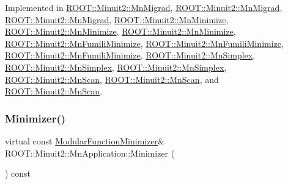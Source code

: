 Implemented in \mbox{\hyperlink{classROOT_1_1Minuit2_1_1MnMigrad_a98fa0ce74bf180a287093ac677e8644c}{R\+O\+O\+T\+::\+Minuit2\+::\+Mn\+Migrad}}, \mbox{\hyperlink{classROOT_1_1Minuit2_1_1MnMigrad_a98fa0ce74bf180a287093ac677e8644c}{R\+O\+O\+T\+::\+Minuit2\+::\+Mn\+Migrad}}, \mbox{\hyperlink{classROOT_1_1Minuit2_1_1MnMigrad_a98fa0ce74bf180a287093ac677e8644c}{R\+O\+O\+T\+::\+Minuit2\+::\+Mn\+Migrad}}, \mbox{\hyperlink{classROOT_1_1Minuit2_1_1MnMinimize_a879bb789f98c72f9a90a327fc7bb48fd}{R\+O\+O\+T\+::\+Minuit2\+::\+Mn\+Minimize}}, \mbox{\hyperlink{classROOT_1_1Minuit2_1_1MnMinimize_a879bb789f98c72f9a90a327fc7bb48fd}{R\+O\+O\+T\+::\+Minuit2\+::\+Mn\+Minimize}}, \mbox{\hyperlink{classROOT_1_1Minuit2_1_1MnMinimize_a879bb789f98c72f9a90a327fc7bb48fd}{R\+O\+O\+T\+::\+Minuit2\+::\+Mn\+Minimize}}, \mbox{\hyperlink{classROOT_1_1Minuit2_1_1MnFumiliMinimize_a96eb0cf96ae7ec874f912b6d2b3e7990}{R\+O\+O\+T\+::\+Minuit2\+::\+Mn\+Fumili\+Minimize}}, \mbox{\hyperlink{classROOT_1_1Minuit2_1_1MnFumiliMinimize_a96eb0cf96ae7ec874f912b6d2b3e7990}{R\+O\+O\+T\+::\+Minuit2\+::\+Mn\+Fumili\+Minimize}}, \mbox{\hyperlink{classROOT_1_1Minuit2_1_1MnFumiliMinimize_a96eb0cf96ae7ec874f912b6d2b3e7990}{R\+O\+O\+T\+::\+Minuit2\+::\+Mn\+Fumili\+Minimize}}, \mbox{\hyperlink{classROOT_1_1Minuit2_1_1MnSimplex_a8fa3495353e667d85e7dbeaffa94b94c}{R\+O\+O\+T\+::\+Minuit2\+::\+Mn\+Simplex}}, \mbox{\hyperlink{classROOT_1_1Minuit2_1_1MnSimplex_a8fa3495353e667d85e7dbeaffa94b94c}{R\+O\+O\+T\+::\+Minuit2\+::\+Mn\+Simplex}}, \mbox{\hyperlink{classROOT_1_1Minuit2_1_1MnSimplex_a8fa3495353e667d85e7dbeaffa94b94c}{R\+O\+O\+T\+::\+Minuit2\+::\+Mn\+Simplex}}, \mbox{\hyperlink{classROOT_1_1Minuit2_1_1MnScan_a9bebaf56360ff70aac6f47590227d8b5}{R\+O\+O\+T\+::\+Minuit2\+::\+Mn\+Scan}}, \mbox{\hyperlink{classROOT_1_1Minuit2_1_1MnScan_a9bebaf56360ff70aac6f47590227d8b5}{R\+O\+O\+T\+::\+Minuit2\+::\+Mn\+Scan}}, and \mbox{\hyperlink{classROOT_1_1Minuit2_1_1MnScan_a9bebaf56360ff70aac6f47590227d8b5}{R\+O\+O\+T\+::\+Minuit2\+::\+Mn\+Scan}}.

\mbox{\label{classROOT_1_1Minuit2_1_1MnApplication_a5a8e1e2658b731b5f4023dd1b1594223}} 
\subsubsection{\texorpdfstring{Minimizer()}{Minimizer()}\hspace{0.1cm}{\footnotesize\ttfamily [3/3]}}
{\footnotesize\ttfamily virtual const \mbox{\hyperlink{classROOT_1_1Minuit2_1_1ModularFunctionMinimizer}{Modular\+Function\+Minimizer}}\& R\+O\+O\+T\+::\+Minuit2\+::\+Mn\+Application\+::\+Minimizer (\begin{DoxyParamCaption}{ }\end{DoxyParamCaption}) const\hspace{0.3cm}{\ttfamily [pure virtual]}}



